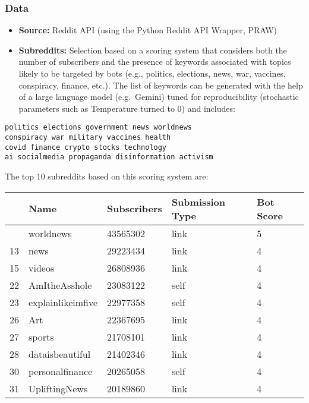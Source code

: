 \documentclass[
  letterpaper,
  DIV=11,
  numbers=noendperiod]{scrartcl}
\providecommand{\tightlist}{%
  \setlength{\itemsep}{0pt}\setlength{\parskip}{0pt}}\usepackage{longtable,booktabs,array}
\begin{document}
\subsubsection{Data}\label{data}

\begin{itemize}
\tightlist
\item
  \textbf{Source:} Reddit API (using the Python Reddit API Wrapper,
  PRAW)
\item
  \textbf{Subreddits:} Selection based on a scoring system that
  considers both the number of subscribers and the presence of keywords
  associated with topics likely to be targeted by bots (e.g., politics,
  elections, news, war, vaccines, conspiracy, finance, etc.). The list
  of keywords can be generated with the help of a large language model
  (e.g.~Gemini) tuned for reproducibility (stochastic parameters such as
  Temperature turned to 0) and includes:
\end{itemize}

\begin{verbatim}
politics elections government news worldnews
conspiracy war military vaccines health
covid finance crypto stocks technology
ai socialmedia propaganda disinformation activism
\end{verbatim}

The top 10 subreddits based on this scoring system are:

\begin{longtable}[]{@{}lllll@{}}
\toprule\noalign{}
& Name & Subscribers & Submission Type & Bot Score \\
\midrule\noalign{}
\endhead
\bottomrule\noalign{}
\endlastfoot
3 & worldnews & 43565302 & link & 5 \\
13 & news & 29223434 & link & 4 \\
15 & videos & 26808936 & link & 4 \\
22 & AmItheAsshole & 23083122 & self & 4 \\
23 & explainlikeimfive & 22977358 & self & 4 \\
26 & Art & 22367695 & link & 4 \\
27 & sports & 21708101 & link & 4 \\
28 & dataisbeautiful & 21402346 & link & 4 \\
30 & personalfinance & 20265058 & self & 4 \\
31 & UpliftingNews & 20189860 & link & 4 \\
\end{longtable}
\end{document}
